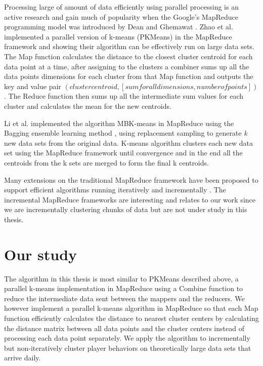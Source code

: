 Processing large of amount of data efficiently using parallel processing is an active research and gain much of popularity when the Google's MapReduce programming model was introduced by Dean and Ghemawat \citep{Dean:2004}. Zhao et al. \citep{Zhao:2009} implemented a parallel version of k-means (PKMeans) in the MapReduce framework and showing their algorithm can be effectively run on large data sets. The Map function calculates the distance to the closest cluster centroid for each data point at a time, after assigning to the clusters a combiner sums up all the data points dimensions for each cluster from that Map function and outputs the key and value pair $(cluster centroid, [sum for all dimensions, number of points])$. The Reduce function then sums up all the intermediate sum values for each cluster and calculates the mean for the new centroids. 

Li et al. \citep{Li:2011} implemented the algorithm MBK-means in MapReduce using the Bagging ensemble learning method \citep{Breiman:1996}, using replacement sampling to generate  \textit{k} new data sets from the original data. K-means algorithm clusters each new data set using the MapReduce framework until convergence and in the end all the centroids from the k sets are merged to form the final k centroids.

Many extensions on the traditional MapReduce framework have been proposed to support efficient algorithms running iteratively \citep{Condie:2010HadoopOnline, Ekanayake:2010Twister, Zaharia:2010Spark, Bu:2010HaLoop, Bu:2012HaLoop, Yan:2012IncMr} and incrementally \citep{Bhatotia:2011Incoop, Yan:2012IncMr, Bhatotia:2012Slider}. The incremental MapReduce frameworks are interesting and relates to our work since we are incrementally clustering chunks of data but are not under study in this thesis.

\section{Our study}
The algorithm in this thesis is most similar to PKMeans \citep{Zhao:2009} described above, a parallel k-means implementation in MapReduce using a Combine function to reduce the intermediate data sent between the mappers and the reducers. We however implement a parallel k-means algorithm in MapReduce so that each Map function efficiently calculates the distance to nearest cluster centers by calculating the distance matrix between all data points and the cluster centers instead of processing each data point separately. We apply the algorithm to incrementally but non-iteratively cluster player behaviors on theoretically large data sets that arrive daily. 


